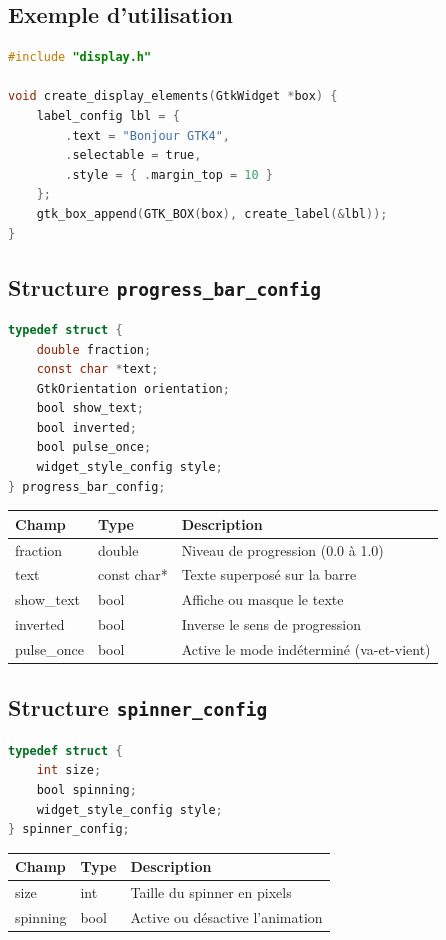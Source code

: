 \subsection{Exemple d'utilisation}
\begin{lstlisting}[language=C]
#include "display.h"

void create_display_elements(GtkWidget *box) {
    label_config lbl = {
        .text = "Bonjour GTK4",
        .selectable = true,
        .style = { .margin_top = 10 }
    };
    gtk_box_append(GTK_BOX(box), create_label(&lbl));
}
\end{lstlisting}
\subsection{Structure \texttt{progress\_bar\_config}}
\begin{lstlisting}[language=C]
typedef struct {
    double fraction;
    const char *text;
    GtkOrientation orientation;
    bool show_text;
    bool inverted;
    bool pulse_once;
    widget_style_config style;
} progress_bar_config;
\end{lstlisting}
\begin{center}
\begin{tabular}{|l|l|p{5cm}|}
\hline
\textbf{Champ} & \textbf{Type} & \textbf{Description} \\
\hline
fraction & double & Niveau de progression (0.0 à 1.0) \\
\hline
text & const char* & Texte superposé sur la barre \\
\hline
show\_text & bool & Affiche ou masque le texte \\
\hline
inverted & bool & Inverse le sens de progression \\
\hline
pulse\_once & bool & Active le mode indéterminé (va-et-vient) \\
\hline
\end{tabular}
\end{center}

\subsection{Structure \texttt{spinner\_config}}
\begin{lstlisting}[language=C]
typedef struct {
    int size;
    bool spinning;
    widget_style_config style;
} spinner_config;
\end{lstlisting}
\begin{center}
\begin{tabular}{|l|l|>{\raggedright\arraybackslash}p{6cm}|}
\hline
\textbf{Champ} & \textbf{Type} & \textbf{Description} \\
\hline
size & int & Taille du spinner en pixels \\
\hline
spinning & bool & Active ou désactive l'animation \\
\hline
\end{tabular}
\end{center}